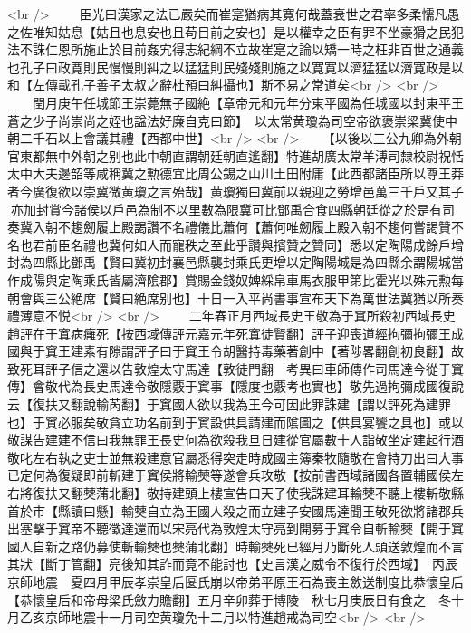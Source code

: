 <br />
　　臣光曰漢家之法已嚴矣而崔寔猶病其寛何哉蓋衰世之君率多柔懦凡愚之佐唯知姑息【姑且也息安也且苟目前之安也】是以權幸之臣有罪不坐豪猾之民犯法不誅仁恩所施止於目前姦宄得志紀綱不立故崔寔之論以矯一時之枉非百世之通義也孔子曰政寛則民慢慢則糾之以猛猛則民殘殘則施之以寛寛以濟猛猛以濟寛政是以和【左傳載孔子善子太叔之辭杜預曰糾攝也】斯不易之常道矣<br />
<br />
　　閏月庚午任城節王崇薨無子國絶【章帝元和元年分東平國為任城國以封東平王蒼之少子尚崇尚之姪也諡法好廉自克曰節】　以太常黄瓊為司空帝欲褒崇梁冀使中朝二千石以上會議其禮【西都中世】<br />
<br />
　　【以後以三公九卿為外朝官東都無中外朝之别也此中朝直謂朝廷朝直遙翻】特進胡廣太常羊溥司隸校尉祝恬太中大夫邊韶等咸稱冀之勲德宜比周公錫之山川土田附庸【此西都諸臣所以尊王莽者今廣復欲以崇冀微黄瓊之言殆哉】黄瓊獨曰冀前以親迎之勞增邑萬三千戶又其子亦加封賞今諸侯以戶邑為制不以里數為限冀可比鄧禹合食四縣朝廷從之於是有司奏冀入朝不趨劒履上殿謁讚不名禮儀比蕭何【蕭何唯劒履上殿入朝不趨何嘗謁贊不名也君前臣名禮也冀何如人而寵秩之至此乎讚與擯贊之贊同】悉以定陶陽成餘戶增封為四縣比鄧禹【賢曰冀初封襄邑縣襲封乘氏更增以定陶陽城是為四縣余謂陽城當作成陽與定陶乘氏皆屬濟隂郡】賞賜金錢奴婢綵帛車馬衣服甲第比霍光以殊元勲每朝會與三公絶席【賢曰絶席别也】十日一入平尚書事宣布天下為萬世法冀猶以所奏禮薄意不悦<br />
<br />
　　二年春正月西域長史王敬為于窴所殺初西域長史趙評在于窴病癰死【按西域傳評元嘉元年死窴徒賢翻】評子迎喪道經拘彌拘彌王成國與于窴王建素有隙謂評子曰于窴王令胡醫持毒藥著創中【著陟畧翻創初良翻】故致死耳評子信之還以告敦煌太守馬達【敦徒門翻　考異曰車師傳作司馬達今從于窴傳】會敬代為長史馬達令敬隱覈于窴事【隱度也覈考也實也】敬先過拘彌成國復說云【復扶又翻說輸芮翻】于窴國人欲以我為王今可因此罪誅建【謂以評死為建罪也】于窴必服矣敬貪立功名前到于窴設供具請建而隂圖之【供具宴饗之具也】或以敬謀告建建不信曰我無罪王長史何為欲殺我旦日建從官屬數十人詣敬坐定建起行酒敬叱左右執之吏士並無殺建意官屬悉得突走時成國主簿秦牧隨敬在會持刀出曰大事已定何為復疑即前斬建于窴侯將輸僰等遂會兵攻敬【按前書西域諸國各置輔國侯左右將復扶又翻僰蒲北翻】敬持建頭上樓宣告曰天子使我誅建耳輸僰不聽上樓斬敬縣首於市【縣讀曰懸】輸僰自立為王國人殺之而立建子安國馬達聞王敬死欲將諸郡兵出塞擊于窴帝不聽徵達還而以宋亮代為敦煌太守亮到開募于窴令自斬輸僰【開于窴國人自新之路仍募使斬輸僰也僰蒲北翻】時輸僰死已經月乃斷死人頭送敦煌而不言其狀【斷丁管翻】亮後知其詐而竟不能討也【史言漢之威令不復行於西域】　丙辰京師地震　夏四月甲辰孝崇皇后匽氏崩以帝弟平原王石為喪主斂送制度比恭懷皇后【恭懷皇后和帝母梁氏斂力贍翻】五月辛卯葬于博陵　秋七月庚辰日有食之　冬十月乙亥京師地震十一月司空黄瓊免十二月以特進趙戒為司空<br />
<br />
